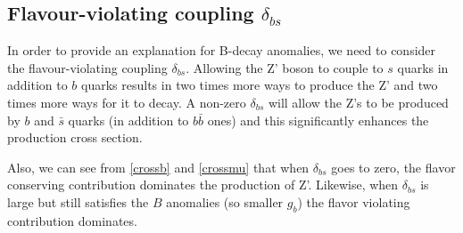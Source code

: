 \subsection{Flavour-violating coupling $\delta_{bs}$}
In order to provide an explanation for B-decay anomalies, we need to consider the flavour-violating coupling $\delta_{bs}$. Allowing the Z' boson to couple to $s$ quarks in addition to $b$ quarks results in two times more ways to produce the Z' and two times more ways for it to decay. A non-zero $\delta_{bs}$ will allow the Z's to be produced by $b$ and $\bar{s}$ quarks (in addition to $b\bar{b}$ ones) and this significantly enhances the production cross section.

Also, we can see from \ref{crossb} and \ref{crossmu} that when $\delta_{bs}$ goes to zero, the flavor conserving contribution dominates the production of Z'. Likewise, when $\delta_{bs}$ is large but still satisfies the $B$ anomalies (so smaller $g_{b}$) the flavor violating contribution dominates.




